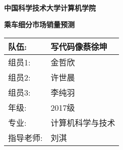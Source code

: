 \documentclass{article}
\begin{document}
\begin{center}
    \ 
    \\[1cm]
    \Huge{\textbf{中国科学技术大学计算机学院}}
    \vspace{5mm}
    
    \huge{}
    \vspace{12mm}
    
    \huge{}
    \vspace{1cm}
    
    \huge{\textbf{乘车细分市场销量预测}}
    \vspace{4cm}
    
    \Large{
        \begin{tabular}{|l|l|}
            \hline
            队伍: & 写代码像蔡徐坤\\
            \hline
            组员1: & 金哲欣\\
            \hline
            组员2: & 许世晨\\
            \hline
            组员3: & 李纯羽\\
            \hline
            年级:  & 2017级\\
            \hline
            专业: & 计算机科学与技术\\
            \hline
            指导老师: & 刘淇\\
            \hline
        \end{tabular}
    }
    \vspace{1.5cm}

    \vspace{0.5cm}

    \end{center}

    \newpage

    \tableofcontents

    \newpage
\end{document}
